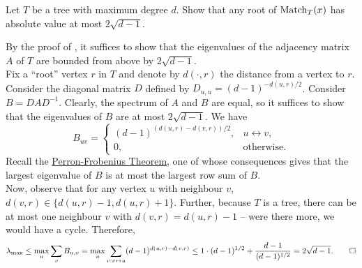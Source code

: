		\begin{problem}
			Let $T$ be a tree with maximum degree $d$. Show that any root of $\operatorname{Match}_T(x)$ has absolute value at most $2\sqrt{d-1}$.
		\end{problem}
		\begin{solution*}

			By the proof of , it suffices to show that the eigenvalues of the adjacency matrix $A$ of $T$ are bounded from above by $2\sqrt{d-1}$.\\
			Fix a ``root'' vertex $r$ in $T$ and denote by $d(\cdot,r)$ the distance from a vertex to $r$. Consider the diagonal matrix $D$ defined by $D_{u,u} = (d-1)^{-d(u,r)/2}$. Consider $B = DAD^{-1}$. Clearly, the spectrum of $A$ and $B$ are equal, so it suffices to show that the eigenvalues of $B$ are at most $2\sqrt{d-1}$. We have
			\[ B_{uv} = \begin{cases} (d-1)^{(d(u,r)-d(v,r))/2}, & u \leftrightarrow v, \\ 0, & \text{otherwise.} \end{cases} \]
			Recall the \href{https://en.wikipedia.org/wiki/Perron%E2%80%93Frobenius_theorem#Perron%E2%80%93Frobenius_theorem_for_irreducible_non-negative_matrices}{Perron-Frobenius Theorem}, one of whose consequences gives that the largest eigenvalue of $B$ is at most the largest row sum of $B$.\\
			Now, observe that for any vertex $u$ with neighbour $v$, $d(v,r) \in \{d(u,r)-1,d(u,r)+1\}$. Further, because $T$ is a tree, there can be at most one neighbour $v$ with $d(v,r) = d(u,r)-1$ -- were there more, we would have a cycle. Therefore,
			\[ \lambda_\text{max} \le \max_u \sum_v B_{u,v} = \max_u \sum_{v : v \leftrightarrow u} (d-1)^{d(u,r)-d(v,r)} \le 1 \cdot (d-1)^{1/2} + \frac{d-1}{(d-1)^{1/2}} = 2\sqrt{d-1}. \qedhere \]
		\end{solution*}

